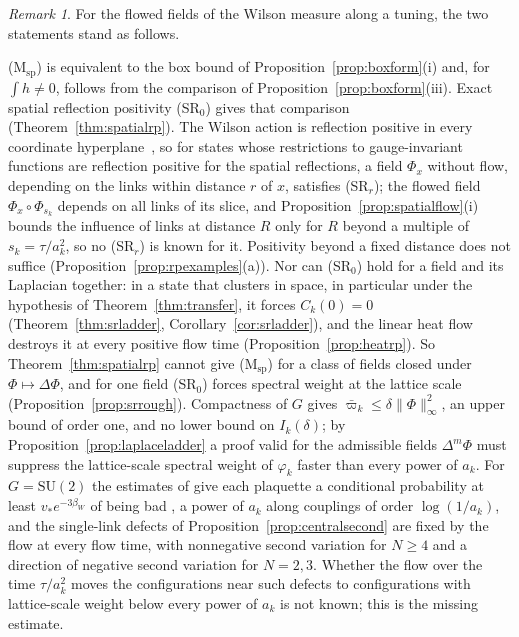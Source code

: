 \documentclass[aps,prd,twocolumn,superscriptaddress,nofootinbib,longbibliography,floatfix,amsmath,amssymb,10pt]{revtex4-2}
\theoremstyle{definition}
\theoremstyle{remark}
\newtheorem{remark}[theorem]{Remark}
\newcommand{\SU}{\mathrm{SU}}
\begin{document}
\begin{remark}\label{rem:spatialstatus}
For the flowed fields of the Wilson measure along a tuning, the two
statements stand as follows.

(M$_{\mathrm{sp}}$) is equivalent to the box bound of
Proposition~\ref{prop:boxform}(i) and, for $\int h\ne0$, follows from the
comparison of Proposition~\ref{prop:boxform}(iii). Exact spatial reflection
positivity (SR$_0$) gives that comparison
(Theorem~\ref{thm:spatialrp}). The Wilson action is reflection positive in
every coordinate hyperplane~\cite{OSei78}, so for states whose restrictions
to gauge-invariant functions are reflection positive for the spatial
reflections, a field $\Phi_x$ without flow, depending on the links within
distance $r$ of $x$, satisfies (SR$_r$); the flowed field
$\Phi_x\circ\Phi_{s_k}$ depends on all links of its slice, and
Proposition~\ref{prop:spatialflow}(i) bounds the influence of links at
distance $R$ only for $R$ beyond a multiple of $s_k=\tau/a_k^2$, so no
(SR$_r$) is known for it. Positivity beyond a fixed distance does not
suffice (Proposition~\ref{prop:rpexamples}(a)). Nor can (SR$_0$) hold for a
field and its Laplacian together: in a state that clusters in space, in
particular under the hypothesis of Theorem~\ref{thm:transfer}, it forces
$C_k(0)=0$ (Theorem~\ref{thm:srladder}, Corollary~\ref{cor:srladder}),
and the linear heat flow destroys it at every positive flow time
(Proposition~\ref{prop:heatrp}). So Theorem~\ref{thm:spatialrp} cannot
give (M$_{\mathrm{sp}}$) for a class of fields closed under $\Phi\mapsto
\Delta\Phi$, and for one field (SR$_0$) forces spectral weight at the
lattice scale (Proposition~\ref{prop:srrough}). Compactness of $G$ gives
$\bar\varpi_k\le\delta\|\Phi\|_\infty^2$, an upper bound of order one, and
no lower bound on $I_k(\delta)$; by
Proposition~\ref{prop:laplaceladder} a proof valid for the admissible
fields $\Delta^m\Phi$ must suppress the lattice-scale spectral weight of
$\varphi_k$ faster than every power of $a_k$. For $G=\SU(2)$ the estimates of
\cite[Sec.~XII\,E]{BBLR26} give each plaquette a conditional probability
at least $v_*e^{-3\beta_W}$ of being bad \cite[Proposition~386]{BBLR26},
a power of $a_k$ along couplings of order $\log(1/a_k)$, and the
single-link defects of Proposition~\ref{prop:centralsecond} are fixed by the
flow at every flow time, with nonnegative second variation for $N\ge4$ and a
direction of negative second variation for $N=2,3$. Whether the flow over
the time $\tau/a_k^2$ moves the configurations near such defects to
configurations with lattice-scale weight below every power of $a_k$ is not
known; this is the missing estimate.


\end{remark}
\end{document}
